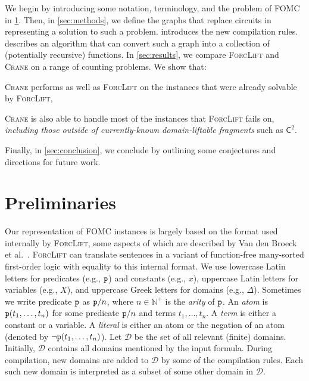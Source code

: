 \documentclass{article}
\newcommand{\Ctwo}{$\mathsf{C}^{2}$}
\newcommand{\predicate}{\texttt{\textup{p}}}
\begin{document}

We begin by introducing some notation, terminology, and the problem of FOMC in
\cref{sec:recprelims}. Then, in \cref{sec:methods}, we define the graphs that
replace circuits in representing a solution to such a problem. 
introduces the new compilation rules.  describes an
algorithm that can convert such a graph into a collection of (potentially
recursive) functions. In \cref{sec:results}, we compare \textsc{ForcLift} and
\textsc{Crane} on a range of counting problems. We show that:
\begin{enumerate*}[label=(\roman*)]
  \item \textsc{Crane} performs as well as \textsc{ForcLift} on the instances
  that were already solvable by \textsc{ForcLift},
  \item \textsc{Crane} is also able to handle most of the instances that
  \textsc{ForcLift} fails on, \emph{including those outside of currently-known
    domain-liftable fragments} such as \Ctwo{}.
\end{enumerate*}
Finally, in \cref{sec:conclusion}, we conclude by outlining some conjectures and
directions for future work.

\section{Preliminaries}\label{sec:recprelims}

Our representation of FOMC instances is largely based on the format used
internally by \textsc{ForcLift}, some aspects of which are described by Van den
Broeck et al.~. \textsc{ForcLift} can
translate sentences in a variant of function-free many-sorted first-order logic
with equality to this internal format. We use lowercase Latin letters for
predicates (e.g., $\predicate$) and constants (e.g., $x$), uppercase Latin
letters for variables (e.g., $X$), and uppercase Greek letters for domains
(e.g., $\Delta$). Sometimes we write predicate $\predicate$ as $\predicate/n$,
where $n \in \mathbb{N}^{+}$ is the \emph{arity} of $\predicate$. An \emph{atom}
is $\predicate(t_1, \dots, t_n)$ for some predicate $\predicate/n$ and terms
$t_{1}, \dots, t_{n}$. A \emph{term} is either a constant or a variable. A
\emph{literal} is either an atom or the negation of an atom (denoted by
$\neg \predicate(t_1, \dots, t_n)$). Let $\mathcal{D}$ be the set of all
relevant (finite) domains. Initially, $\mathcal{D}$ contains all domains
mentioned by the input formula. During compilation, new domains are added to
$\mathcal{D}$ by some of the compilation rules. Each such new domain is
interpreted as a subset of some other domain in $\mathcal{D}$.
\end{document}
